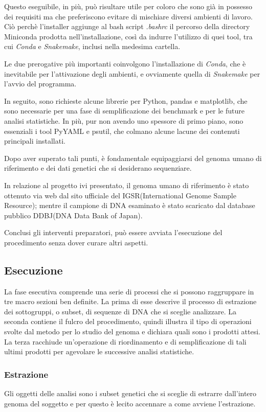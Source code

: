 Questo eseguibile, in più, può risultare utile per coloro che sono già in possesso dei requisiti ma che preferiscono evitare di mischiare diversi ambienti di lavoro.
Ciò perchè l'installer aggiunge al bash script \textit{.bashrc} il percorso della directory Miniconda prodotta nell'installazione, così da indurre l'utilizzo di quei tool, tra cui \textit{Conda} e \textit{Snakemake}, inclusi nella medesima cartella.


Le due prerogative più importanti coinvolgono l'installazione di \textit{Conda}, che è inevitabile per l'attivazione degli ambienti, e ovviamente quella di \textit{Snakemake} per l'avvio del programma.


In seguito, sono richieste alcune librerie per Python, pandas e matplotlib, che sono necessarie per una fase di semplificazione dei benchmark e per le future analisi statistiche.
In più, pur non avendo uno spessore di primo piano, sono essenziali i tool PyYAML e psutil, che colmano alcune lacune dei contenuti principali installati.


Dopo aver superato tali punti, è fondamentale equipaggiarsi del genoma umano di riferimento e dei dati genetici che si desiderano sequenziare.


In relazione al progetto ivi presentato, il genoma umano di riferimento è stato ottenuto via web dal sito ufficiale del IGSR(International Genome Sample Resource); mentre il campione di DNA esaminato è stato scaricato dal database pubblico DDBJ(DNA Data Bank of Japan).


Conclusi gli interventi preparatori, può essere avviata l'esecuzione del procedimento senza dover curare altri aspetti.


\subsection{Esecuzione}
La fase esecutiva comprende una serie di processi che si possono raggruppare in tre macro sezioni ben definite.
La prima di esse descrive il processo di estrazione dei sottogruppi, o subset, di sequenze di DNA che si sceglie analizzare.
La seconda contiene il fulcro del procedimento, quindi illustra il tipo di operazioni svolte dal metodo per lo studio del genoma e dichiara quali sono i prodotti attesi.
La terza racchiude un'operazione di riordinamento e di semplificazione di tali ultimi prodotti per agevolare le successive analisi statistiche.



\subsubsection{Estrazione}
\label{subsubsec: ext}
Gli oggetti delle analisi sono i subset genetici che si sceglie di estrarre dall'intero genoma del soggetto e per questo è lecito accennare a come avviene l'estrazione.

